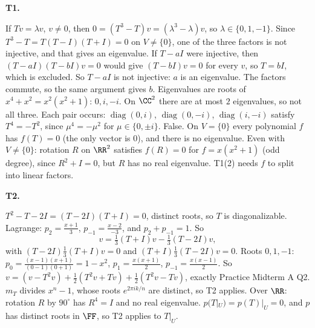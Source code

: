 \documentclass[10pt]{scrartcl}
\begin{document}
\textbf{T1.}
\begin{enumerate}[(a)]
  \ii If $Tv=\lambda v$, $v\ne0$, then $0=(T^3-T)v=(\lambda^3-\lambda)v$, so $\lambda\in\{0,1,-1\}$. Since $T^3-T=T(T-I)(T+I)=0$ on $V\ne\{0\}$, one of the three factors is not injective, and that gives an eigenvalue.
  \ii If $T-aI$ were injective, then $(T-aI)(T-bI)v=0$ would give $(T-bI)v=0$ for every $v$, so $T=bI$, which is excluded. So $T-aI$ is not injective: $a$ is an eigenvalue. The factors commute, so the same argument gives $b$.
  \ii Eigenvalues are roots of $x^4+x^2=x^2(x^2+1)$: $0,i,-i$. On $\CC^2$ there are at most $2$ eigenvalues, so not all three. Each pair occurs: $\operatorname{diag}(0,i)$, $\operatorname{diag}(0,-i)$, $\operatorname{diag}(i,-i)$ satisfy $T^4=-T^2$, since $\mu^4=-\mu^2$ for $\mu\in\{0,\pm i\}$.
  \ii False. On $V=\{0\}$ every polynomial $f$ has $f(T)=0$ (the only vector is $0$), and there is no eigenvalue. Even with $V\ne\{0\}$: rotation $R$ on $\RR^2$ satisfies $f(R)=0$ for $f=x(x^2+1)$ (odd degree), since $R^2+I=0$, but $R$ has no real eigenvalue. T1(2) needs $f$ to split into linear factors.
\end{enumerate}

\textbf{T2.}
\begin{enumerate}[(a)]
  \ii $T^2-T-2I=(T-2I)(T+I)=0$, distinct roots, so $T$ is diagonalizable. Lagrange: $p_2=\frac{x+1}{3}$, $p_{-1}=\frac{x-2}{-3}$, and $p_2+p_{-1}=1$. So
  \[ v=\tfrac13(T+I)v-\tfrac13(T-2I)v, \]
  with $(T-2I)\tfrac13(T+I)v=0$ and $(T+I)\tfrac13(T-2I)v=0$.
  \ii Roots $0,1,-1$: $p_0=\frac{(x-1)(x+1)}{(0-1)(0+1)}=1-x^2$, $p_1=\frac{x(x+1)}{2}$, $p_{-1}=\frac{x(x-1)}{2}$. So $v=(v-T^2v)+\tfrac12(T^2v+Tv)+\tfrac12(T^2v-Tv)$, exactly Practice Midterm A Q2.
  \ii $m_T$ divides $x^n-1$, whose roots $e^{2\pi ik/n}$ are distinct, so T2 applies. Over $\RR$: rotation $R$ by $90^\circ$ has $R^4=I$ and no real eigenvalue.
  \ii $p(T|_U)=p(T)|_U=0$, and $p$ has distinct roots in $\FF$, so T2 applies to $T|_U$.
\end{enumerate}
\end{document}
